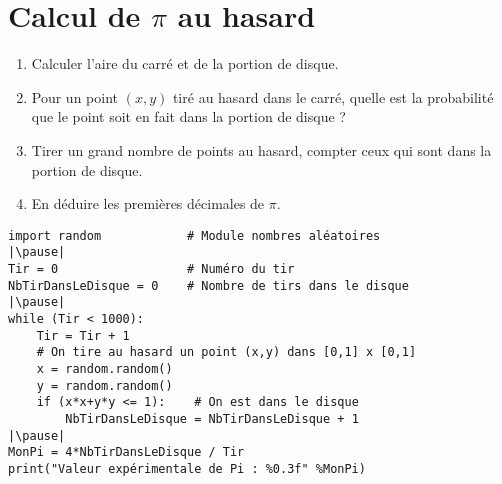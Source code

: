 \section{Calcul de $\pi$ au hasard}

\begin{frame}

\begin{tp}
\begin{enumerate}
  \item Calculer l'aire du carré et de la portion de disque.
  \item Pour un point $(x,y)$ tiré au hasard dans le carré, quelle est la probabilité que le point soit en fait dans la portion de disque ?
  \item Tirer un grand nombre de points au hasard, compter ceux qui sont dans la portion de disque.
  \item En déduire les premières décimales de $\pi$.
\end{enumerate} 
\end{tp}

\end{frame}


\begin{frame}[fragile]

\begin{algo}[pi-hasard.py]
\begin{lstlisting}
import random            # Module nombres aléatoires 
|\pause|
Tir = 0                  # Numéro du tir
NbTirDansLeDisque = 0    # Nombre de tirs dans le disque
|\pause|
while (Tir < 1000):
    Tir = Tir + 1
    # On tire au hasard un point (x,y) dans [0,1] x [0,1]
    x = random.random()   
    y = random.random()
    if (x*x+y*y <= 1):    # On est dans le disque
        NbTirDansLeDisque = NbTirDansLeDisque + 1
|\pause|        
MonPi = 4*NbTirDansLeDisque / Tir
print("Valeur expérimentale de Pi : %0.3f" %MonPi)
\end{lstlisting}  
\end{algo}
\end{frame}


